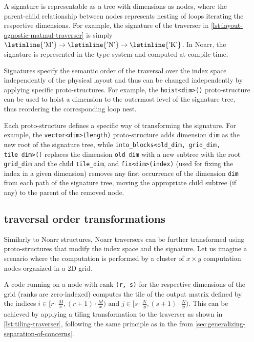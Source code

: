 A signature is representable as a tree with dimensions as nodes, where the parent-child relationship between nodes represents nesting of loops iterating the respective dimensions. For example, the signature of the traverser in \cref{lst:layout-agnostic-matmul-traverser} is simply $\text{\lstinline{'M'}} \to \text{\lstinline{'N'}} \to \text{\lstinline{'K'}}$. In Noarr, the signature is represented in the type system and computed at compile time.

Signatures specify the semantic order of the traversal over the index space independently of the physical layout and thus can be changed independently by applying specific proto-structures. For example, the \lstinline{hoist<dim>()} proto-structure can be used to hoist a dimension to the outermost level of the signature tree, thus reordering the corresponding loop nest.

Each proto-structure defines a specific way of transforming the signature. For example, the \lstinline{vector<dim>(length)} proto-structure adds dimension \texttt{dim} as the new root of the signature tree, while \lstinline{into_blocks<old_dim, grid_dim, tile_dim>()} replaces the dimension \texttt{old\_dim} with a new subtree with the root \texttt{grid\_dim} and the child \texttt{tile\_dim}, and \lstinline{fix<dim>(index)} (used for fixing the index in a given dimension) removes any first occurrence of the dimension \texttt{dim} from each path of the signature tree, moving the appropriate child subtree (if any) to the parent of the removed node.


\subsection{traversal order transformations}\label{sec:traversal-order-transformations}

Similarly to Noarr structures, Noarr traversers can be further transformed using proto-structures that modify the index space and the signature. Let us imagine a scenario where the computation is performed by a cluster of $x \times y$ computation nodes organized in a 2D grid.

A code running on a node with rank \texttt{(r, s)} for the respective dimensions of the grid (ranks are zero-indexed) computes the tile of the output matrix defined by the indices $i \in [r \cdot \frac{M}{x}, (r + 1) \cdot \frac{M}{x})$ and $j \in [s \cdot \frac{N}{y}, (s + 1) \cdot \frac{N}{y})$. This can be achieved by applying a tiling transformation to the traverser as shown in \cref{lst:tiling-traverser}, following the same principle as in the  from \cref{sec:generalizing-separation-of-concerns}.

